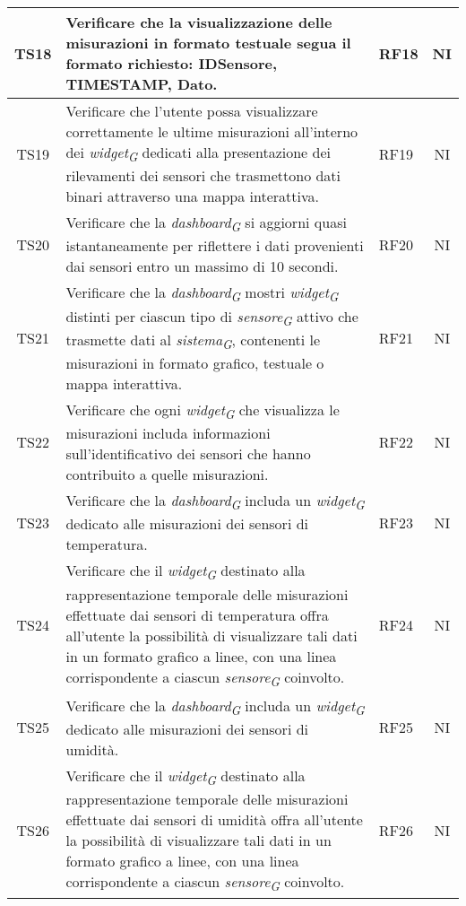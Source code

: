 \begin{longtable}{|c|p{5cm}|>{\raggedright}p{2cm}|c|}
        \hline
        TS18 & Verificare che la visualizzazione delle misurazioni in formato testuale segua il formato richiesto: IDSensore, TIMESTAMP, Dato. & RF18 & NI \\
        \hline
        TS19 & Verificare che l'utente possa visualizzare correttamente le ultime misurazioni all'interno dei \textit{widget}\textsubscript{\textit{G}} dedicati alla presentazione dei rilevamenti dei sensori che trasmettono dati binari attraverso una mappa interattiva. & RF19 & NI \\
        \hline
        TS20 & Verificare che la \textit{dashboard}\textsubscript{\textit{G}} si aggiorni quasi istantaneamente per riflettere i dati provenienti dai sensori entro un massimo di 10 secondi. & RF20 & NI \\
        \hline
        TS21 & Verificare che la \textit{dashboard}\textsubscript{\textit{G}} mostri \textit{widget}\textsubscript{\textit{G}} distinti per ciascun tipo di \textit{sensore}\textsubscript{\textit{G}} attivo che trasmette dati al \textit{sistema}\textsubscript{\textit{G}}, contenenti le misurazioni in formato grafico, testuale o mappa interattiva. & RF21 & NI \\
        \hline
        TS22 & Verificare che ogni \textit{widget}\textsubscript{\textit{G}} che visualizza le misurazioni includa informazioni sull'identificativo dei sensori che hanno contribuito a quelle misurazioni. & RF22 & NI \\
        \hline
        TS23 & Verificare che la \textit{dashboard}\textsubscript{\textit{G}} includa un \textit{widget}\textsubscript{\textit{G}} dedicato alle misurazioni dei sensori di temperatura. & RF23 & NI \\
        \hline
        TS24 & Verificare che il \textit{widget}\textsubscript{\textit{G}} destinato alla rappresentazione temporale delle misurazioni effettuate dai sensori di temperatura offra all'utente la possibilità di visualizzare tali dati in un formato grafico a linee, con una linea corrispondente a ciascun \textit{sensore}\textsubscript{\textit{G}} coinvolto. & RF24 & NI \\
        \hline
        TS25 & Verificare che la \textit{dashboard}\textsubscript{\textit{G}} includa un \textit{widget}\textsubscript{\textit{G}} dedicato alle misurazioni dei sensori di umidità. & RF25 & NI \\
        \hline
        TS26 & Verificare che il \textit{widget}\textsubscript{\textit{G}} destinato alla rappresentazione temporale delle misurazioni effettuate dai sensori di umidità offra all'utente la possibilità di visualizzare tali dati in un formato grafico a linee, con una linea corrispondente a ciascun \textit{sensore}\textsubscript{\textit{G}} coinvolto. & RF26 & NI \\

\end{longtable}
